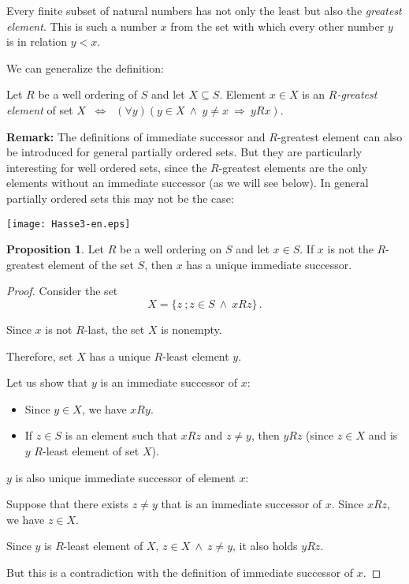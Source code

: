 \documentclass[11pt,paper=b5,footinclude,headinclude]{scrbook} %
\def\inn {{~\wedge~}}
\def\sledi {{~\Rightarrow~}}
\def\cee {{~\Leftrightarrow~}}
\theoremstyle{remark}
\theoremstyle{definition} %
\theoremstyle{theorem} %
\newtheorem*{proposition}{Proposition}
\begin{document}
\bigskip
Every finite subset of natural numbers has not only the least but also the {\em greatest element}.
This is such a number $x$ from the set with which every other number $y$ is in relation $y<x$.

\medskip
We can generalize the definition:

Let $R$ be a well ordering of $S$ and let $X\subseteq S$.
Element $x\in X$ is an  {\em $R$-greatest element} of set $X$ $\cee$ $(\forall y)(y\in X\inn y\neq x\sledi yRx)$.

\bigskip

\textbf{ Remark:}
The definitions of immediate successor and $R$-greatest element can also be introduced for general partially ordered sets.
But they are particularly interesting for well ordered sets, since the $R$-greatest elements are the only elements without an immediate
successor (as we will see below).
In general partially ordered sets this may not be the case:
\begin{center}
\texttt{[image: Hasse3-en.eps]}
\end{center}

\bigskip
\begin{proposition}
Let $R$ be a well ordering on $S$ and let $x\in S$. If $x$ is not the  $R$-greatest element of the set $S$, then $x$
has a unique immediate successor.
\end{proposition}

\begin{proof}
Consider the set
$$X = \{z~;z\in S\inn xRz\}\,.$$

Since $x$ is not $R$-last, the set $X$ is nonempty.

Therefore, set $X$ has a unique $R$-least element $y$.

Let us show that $y$ is an immediate successor of $x$:
\begin{itemize}
  \item Since $y\in X$, we have $xRy$.
  \item If $z\in S$ is an element such that $xRz$ and $z\neq y$, then
$yRz$ (since $z\in X$ and  is $y$ $R$-least  element of set $X$).
\end{itemize}

$y$ is also unique immediate successor of element $x$:

Suppose that there exists $z\neq y$ that is an immediate successor of $x$.
Since $xRz$, we have  $z\in X$.

Since $y$ is $R$-least element of  $X$, $z\in X\inn z\neq y$,
it also holds $yRz$.

But this is a contradiction with the definition of immediate successor of $x$.
\end{proof}
\end{document}
